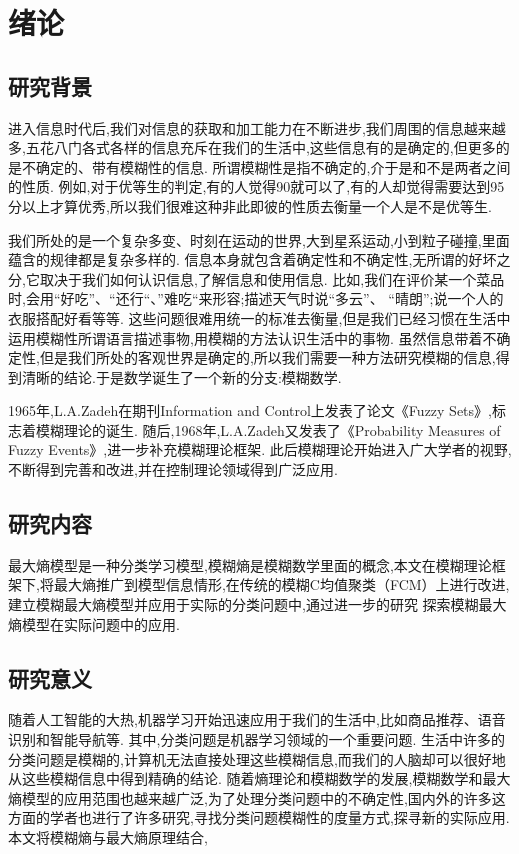 \chapter[绪论]{绪论}
\section{研究背景}
\par
进入信息时代后,我们对信息的获取和加工能力在不断进步,我们周围的信息越来越多,五花八门各式各样的信息充斥在我们的生活中,这些信息有的是确定的,但更多的是不确定的、带有模糊性的信息.
所谓模糊性是指不确定的,介于是和不是两者之间的性质.
例如,对于优等生的判定,有的人觉得90就可以了,有的人却觉得需要达到95分以上才算优秀,所以我们很难这种非此即彼的性质去衡量一个人是不是优等生.
\par
我们所处的是一个复杂多变、时刻在运动的世界,大到星系运动,小到粒子碰撞,里面蕴含的规律都是复杂多样的.
信息本身就包含着确定性和不确定性,无所谓的好坏之分,它取决于我们如何认识信息,了解信息和使用信息.
比如,我们在评价某一个菜品时,会用“好吃”、“还行“、”难吃“来形容;描述天气时说“多云”、 “晴朗”;说一个人的衣服搭配好看等等.
这些问题很难用统一的标准去衡量,但是我们已经习惯在生活中运用模糊性所谓语言描述事物,用模糊的方法认识生活中的事物.
虽然信息带着不确定性,但是我们所处的客观世界是确定的,所以我们需要一种方法研究模糊的信息,得到清晰的结论.于是数学诞生了一个新的分支:模糊数学.
\par
1965年,L.A.Zadeh在期刊Information and Control上发表了论文《Fuzzy Sets》\cite{ZADEH1965fuzzy},标志着模糊理论的诞生.
随后,1968年,L.A.Zadeh又发表了《Probability Measures of Fuzzy Events》\cite{zadeh1968probability},进一步补充模糊理论框架.
此后模糊理论开始进入广大学者的视野,不断得到完善和改进,并在控制理论领域得到广泛应用.
\section{研究内容}
最大熵模型是一种分类学习模型,模糊熵是模糊数学里面的概念,本文在模糊理论框架下,将最大熵推广到模型信息情形,在传统的模糊C均值聚类（FCM）上进行改进,建立模糊最大熵模型并应用于实际的分类问题中,通过进一步的研究 探索模糊最大熵模型在实际问题中的应用.
\section{研究意义}
随着人工智能的大热,机器学习开始迅速应用于我们的生活中,比如商品推荐、语音识别和智能导航等.
其中,分类问题是机器学习领域的一个重要问题.
生活中许多的分类问题是模糊的,计算机无法直接处理这些模糊信息,而我们的人脑却可以很好地从这些模糊信息中得到精确的结论.
随着熵理论和模糊数学的发展,模糊数学和最大熵模型的应用范围也越来越广泛,为了处理分类问题中的不确定性,国内外的许多这方面的学者也进行了许多研究,寻找分类问题模糊性的度量方式,探寻新的实际应用.本文将模糊熵与最大熵原理结合,
